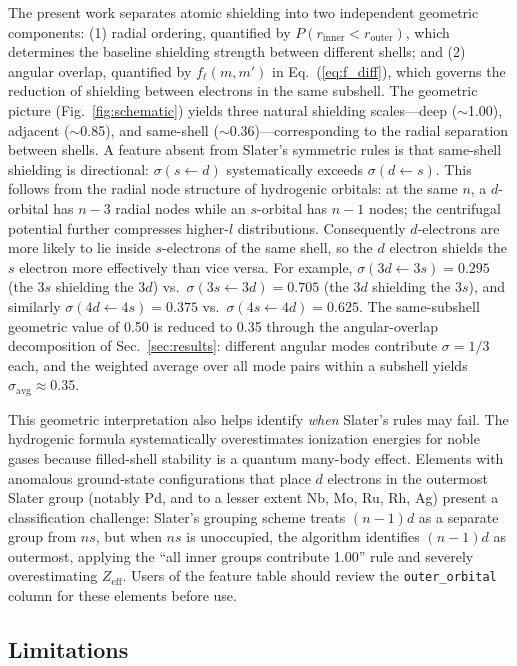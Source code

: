 \documentclass[11pt,a4paper]{article}
\begin{document}
The present work separates atomic shielding into two independent geometric components: (1) radial ordering, quantified by $P(r_{\mathrm{inner}} < r_{\mathrm{outer}})$, which determines the baseline shielding strength between different shells; and (2) angular overlap, quantified by $f_\ell(m,m')$ in Eq.~(\ref{eq:f_diff}), which governs the reduction of shielding between electrons in the same subshell. The geometric picture (Fig.~\ref{fig:schematic}) yields three natural shielding scales---deep ($\sim$1.00), adjacent ($\sim$0.85), and same-shell ($\sim$0.36)---corresponding to the radial separation between shells. A feature absent from Slater's symmetric rules is that same-shell shielding is directional: $\sigma(s\leftarrow d)$ systematically exceeds $\sigma(d\leftarrow s)$. This follows from the radial node structure of hydrogenic orbitals: at the same $n$, a $d$-orbital has $n-3$ radial nodes while an $s$-orbital has $n-1$ nodes; the centrifugal potential further compresses higher-$l$ distributions. Consequently $d$-electrons are more likely to lie inside $s$-electrons of the same shell, so the $d$ electron shields the $s$ electron more effectively than vice versa. For example, $\sigma(3d\leftarrow 3s)=0.295$ (the $3s$ shielding the $3d$) vs.\ $\sigma(3s\leftarrow 3d)=0.705$ (the $3d$ shielding the $3s$), and similarly $\sigma(4d\leftarrow 4s)=0.375$ vs.\ $\sigma(4s\leftarrow 4d)=0.625$. The same-subshell geometric value of 0.50 is reduced to 0.35 through the angular-overlap decomposition of Sec.~\ref{sec:results}: different angular modes contribute $\sigma=1/3$ each, and the weighted average over all mode pairs within a subshell yields $\sigma_{\mathrm{avg}}\approx 0.35$.

This geometric interpretation also helps identify \textit{when} Slater's rules may fail. The hydrogenic formula systematically overestimates ionization energies for noble gases because filled-shell stability is a quantum many-body effect. Elements with anomalous ground-state configurations that place $d$ electrons in the outermost Slater group (notably Pd, and to a lesser extent Nb, Mo, Ru, Rh, Ag) present a classification challenge: Slater's grouping scheme treats $(n-1)d$ as a separate group from $ns$, but when $ns$ is unoccupied, the algorithm identifies $(n-1)d$ as outermost, applying the ``all inner groups contribute 1.00'' rule and severely overestimating $Z_{\mathrm{eff}}$. Users of the feature table should review the \texttt{outer\_orbital} column for these elements before use.

\subsection{Limitations}
\end{document}
